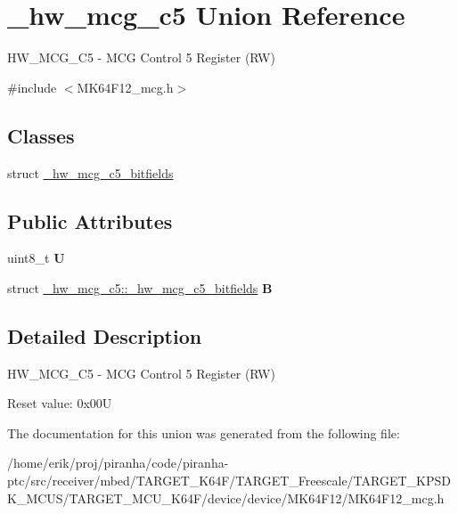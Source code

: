 \hypertarget{union__hw__mcg__c5}{}\section{\+\_\+hw\+\_\+mcg\+\_\+c5 Union Reference}
\label{union__hw__mcg__c5}


H\+W\+\_\+\+M\+C\+G\+\_\+\+C5 -\/ M\+CG Control 5 Register (RW)  




{\ttfamily \#include $<$M\+K64\+F12\+\_\+mcg.\+h$>$}

\subsection*{Classes}
\begin{DoxyCompactItemize}
\item 
struct \hyperlink{struct__hw__mcg__c5_1_1__hw__mcg__c5__bitfields}{\+\_\+hw\+\_\+mcg\+\_\+c5\+\_\+bitfields}
\end{DoxyCompactItemize}
\subsection*{Public Attributes}
\begin{DoxyCompactItemize}
\item 
uint8\+\_\+t {\bfseries U}\hypertarget{union__hw__mcg__c5_a283ef3ff10eeb347c99052345b639866}{}\label{union__hw__mcg__c5_a283ef3ff10eeb347c99052345b639866}

\item 
struct \hyperlink{struct__hw__mcg__c5_1_1__hw__mcg__c5__bitfields}{\+\_\+hw\+\_\+mcg\+\_\+c5\+::\+\_\+hw\+\_\+mcg\+\_\+c5\+\_\+bitfields} {\bfseries B}\hypertarget{union__hw__mcg__c5_adb98c85bc1eb14ed3fa8d794fe0a8119}{}\label{union__hw__mcg__c5_adb98c85bc1eb14ed3fa8d794fe0a8119}

\end{DoxyCompactItemize}


\subsection{Detailed Description}
H\+W\+\_\+\+M\+C\+G\+\_\+\+C5 -\/ M\+CG Control 5 Register (RW) 

Reset value\+: 0x00U 

The documentation for this union was generated from the following file\+:\begin{DoxyCompactItemize}
\item 
/home/erik/proj/piranha/code/piranha-\/ptc/src/receiver/mbed/\+T\+A\+R\+G\+E\+T\+\_\+\+K64\+F/\+T\+A\+R\+G\+E\+T\+\_\+\+Freescale/\+T\+A\+R\+G\+E\+T\+\_\+\+K\+P\+S\+D\+K\+\_\+\+M\+C\+U\+S/\+T\+A\+R\+G\+E\+T\+\_\+\+M\+C\+U\+\_\+\+K64\+F/device/device/\+M\+K64\+F12/M\+K64\+F12\+\_\+mcg.\+h\end{DoxyCompactItemize}
